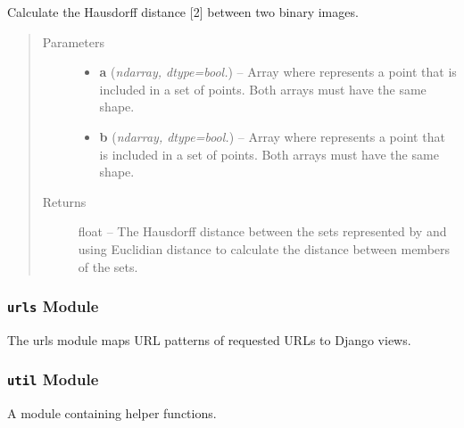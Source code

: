 \documentclass[letterpaper,10pt,english]{sphinxmanual}
\begin{document}
\begin{fulllineitems}
\label{Contour.contour:Contour.contour.set_metrics.hausdorff_distance_region}
Calculate the Hausdorff distance {[}2{]} between two binary images.
\begin{quote}\begin{description}
\item[{Parameters}] \leavevmode\begin{itemize}
\item {} 
\textbf{a} (\emph{ndarray, dtype=bool.}) -- Array where  represents a point that is included in a set of points. Both arrays must have the same shape.

\item {} 
\textbf{b} (\emph{ndarray, dtype=bool.}) -- Array where  represents a point that is included in a set of points. Both arrays must have the same shape.

\end{itemize}

\item[{Returns}] \leavevmode
float -- The Hausdorff distance between the sets represented by  and  using Euclidian distance to calculate the distance between members of the sets.

\end{description}\end{quote}

\end{fulllineitems}



\subsubsection{\texttt{urls} Module}
\label{Contour.contour:module-Contour.contour.urls}\label{Contour.contour:urls-module}
The urls module maps URL patterns of requested URLs to Django views.


\subsubsection{\texttt{util} Module}
\label{Contour.contour:module-Contour.contour.util}\label{Contour.contour:util-module}
A module containing helper functions.
\end{document}
